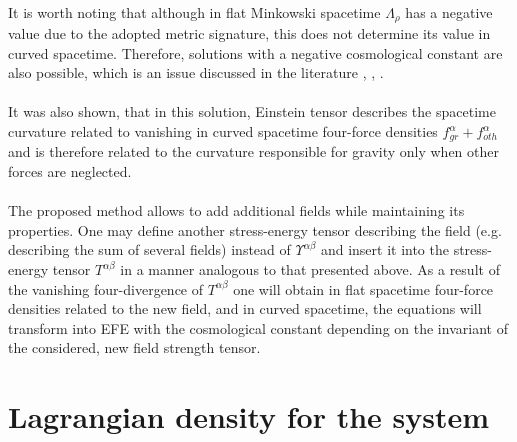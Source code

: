 \documentclass[aps,prx,preprint,groupedaddress,showkeys]{revtex4-2}
\begin{document}
~\\
It is worth noting that although in flat Minkowski spacetime $\Lambda_{\rho}$ has a negative value due to the adopted metric signature, this does not determine its value in curved spacetime. Therefore, solutions with a negative cosmological constant are also possible, which is an issue discussed in the literature \cite{NL1}, \cite{NL2}, \cite{NL3}.\\
~\\
It was also shown, that in this solution, Einstein tensor describes the spacetime curvature related to vanishing in curved spacetime four-force densities $f^{\alpha}_{gr} + f^{\alpha}_{oth}$ and is therefore related to the curvature responsible for gravity only when other forces are neglected.\\
~\\
The proposed method allows to add additional fields while maintaining its properties. One may define another stress-energy tensor describing the field (e.g. describing the sum of several fields) instead of $\Upsilon^{\alpha \beta}$ and insert it into the stress-energy tensor $T^{\alpha \beta}$ in a manner analogous to that presented above. As a result of the vanishing four-divergence of $T^{\alpha \beta}$ one will obtain in flat spacetime four-force densities related to the new field, and in curved spacetime, the equations will transform into EFE with the cosmological constant depending on the invariant of the considered, new field strength tensor.

\section{Lagrangian density for the system} \label{SepOfFields}
\end{document}
